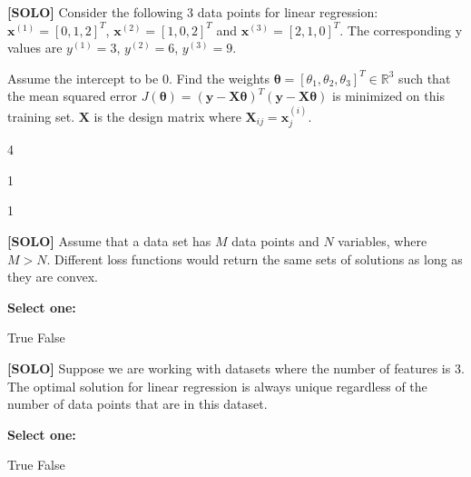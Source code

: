 \documentclass[11pt,addpoints,answers]{exam}
\newcommand{\xv}{\mathbf{x}}
\newcommand{\yv}{\mathbf{y}}
\newcommand{\Xv}{\mathbf{X}}
\newcommand{\thetav     }{\boldsymbol \theta     }
\begin{document}
\begin{questions}
\begin{parts}
    \end{parts}
    
    \clearpage
    
    \question[3] \textbf{[SOLO]} Consider the following 3 data points for linear regression: $\xv^{(1)} = [0, 1, 2]^T$, $\xv^{(2)} = [1, 0, 2]^T$ and $\xv^{(3)} = [2, 1, 0]^T$. The corresponding y values are $y^{(1)}=3$, $y^{(2)}=6$, $y^{(3)}=9$.
    
    Assume the intercept to be 0. Find the weights $\thetav = [\theta_1,  \theta_2,  \theta_3]^T \in \mathbb{R}^3$ such that the mean squared error $J(\thetav) = (\mathbf{\yv} - \Xv \thetav)^T(\mathbf{\yv} - \Xv \thetav)$ is minimized on this training set. $\Xv$ is the design matrix where $\Xv_{ij} = \xv_j^{(i)}$. 
    
    \begin{your_solution}[title=$\theta_1$:,height=2cm,width=5cm]
    4
    \end{your_solution}
    \begin{your_solution}[title=$\theta_2$:,height=2cm,width=5cm]
    1
    \end{your_solution}
    \begin{your_solution}[title=$\theta_3$:,height=2cm,width=5cm]
    1
    \end{your_solution}
    
    
    

    \question[1] \textbf{[SOLO]} Assume that a data set has $M$ data points and $N$ variables, where $M>N$. Different loss functions would return the same sets of solutions as long as they are convex.
    
    \textbf{Select one:}
    \begin{checkboxes}
        \choice True
        \CorrectChoice False
    \end{checkboxes}
    
    
    
\question[1] \textbf{[SOLO]} Suppose we are working with datasets where the number of features is 3. The optimal solution for linear regression is always unique regardless of the number of data points that are in this dataset.
    
    \textbf{Select one:}
    \begin{checkboxes}
        \choice True
        \CorrectChoice False
    \end{checkboxes}
    

\end{questions}
\end{document}
